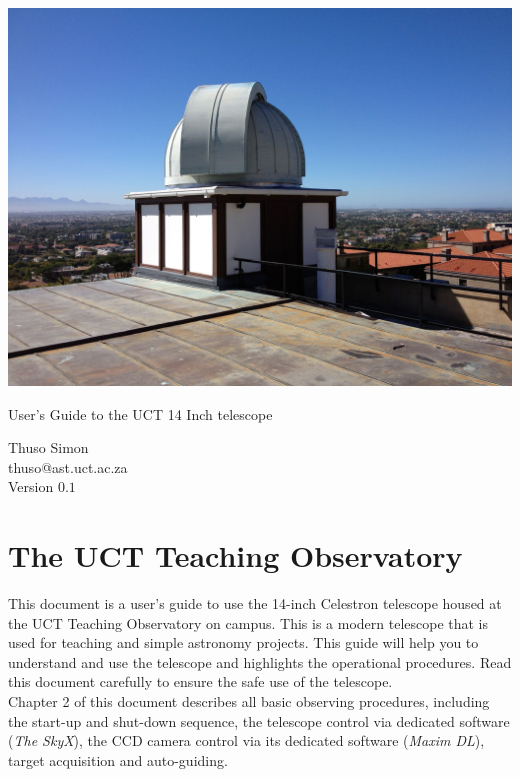 \documentclass[12pt,twoside,a4paper]{report}
\begin{document}
\begin{titlepage}

\centering
 \includegraphics[width=15cm]{documentation_images/Dome14in.jpg}

\vspace{2cm}
{\Huge User's Guide to the UCT 14 Inch telescope}

\vspace{1cm}

{\small
Thuso Simon \\
thuso@ast.uct.ac.za \\
Version $0.1$}

\end{titlepage}

\tableofcontents


\chapter{The UCT Teaching Observatory}

This document is a user's guide to use the 14-inch Celestron telescope housed at the UCT Teaching Observatory
on campus. This is a modern telescope that is used for teaching and simple astronomy projects. This guide will 
help you to understand and use the telescope and highlights the operational procedures. Read this document
carefully to ensure the safe use of the telescope.\\

Chapter 2 of this document describes all basic observing procedures, including the start-up and shut-down sequence,
the telescope control via dedicated software (\emph{The SkyX}), the CCD camera control via its dedicated
software (\emph{Maxim DL}), target acquisition and auto-guiding.\\
\end{document}
